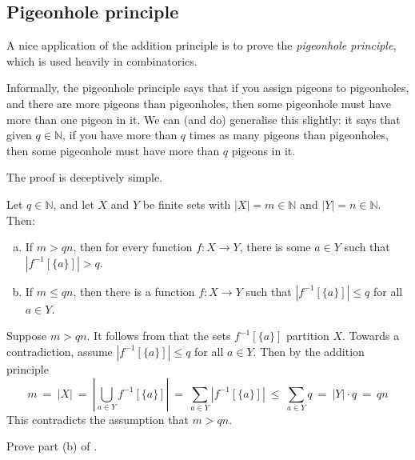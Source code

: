 \subsection*{Pigeonhole principle}

A nice application of the addition principle is to prove the \textit{pigeonhole principle}, which is used heavily in combinatorics.

Informally, the pigeonhole principle says that if you assign pigeons to pigeonholes, and there are more pigeons than pigeonholes, then some pigeonhole must have more than one pigeon in it. We can (and do) generalise this slightly: it says that given $q \in \mathbb{N}$, if you have more than $q$ times as many pigeons than pigeonholes, then some pigeonhole must have more than $q$ pigeons in it.

The proof is deceptively simple.

\begin{theorem}
\label{thmPigeonholePrinciple}
Let $q \in \mathbb{N}$, and let $X$ and $Y$ be finite sets with $|X| = m \in \mathbb{N}$ and $|Y| = n \in \mathbb{N}$. Then:
\begin{enumerate}[(a)]
\item If $m > qn$, then for every function $f : X \to Y$, there is some $a \in Y$ such that $|f^{-1}[\{a\}]| > q$.
\item If $m \le qn$, then there is a function $f : X \to Y$ such that $|f^{-1}[\{a\}]| \le q$ for all $a \in Y$.
\end{enumerate}
\end{theorem}

\begin{cproof}[of {(a)}]
Suppose $m>qn$. It follows from  that the sets $f^{-1}[\{a\}]$ partition $X$. Towards a contradiction, assume $|f^{-1}[\{a\}]| \le q$ for all $a \in Y$. Then by the addition principle
\[ m ~=~ |X| ~=~ \left| \bigcup_{a \in Y} f^{-1}[\{a\}] \right| ~=~ \sum_{a \in Y} |f^{-1}[\{a\}]| ~\le~ \sum_{a \in Y} q ~=~ |Y| \cdot q ~=~ qn \]
This contradicts the assumption that $m > qn$.
\end{cproof}

\begin{exercise}
Prove part (b) of .
\end{exercise}

